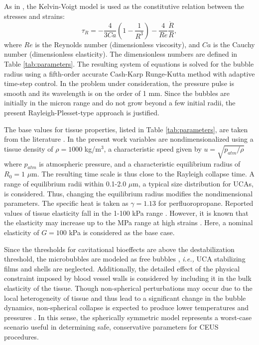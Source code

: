 \documentclass[%
preprint,%
author-year,%
]{jasatex}
\begin{document}
As in \cite{yang2005}, the Kelvin-Voigt model is used as the
constitutive relation between the stresses and strains:
\begin{equation}
  \tau_R = -\frac{4}{3
  Ca}\left(1-\frac{1}{R^3}\right) - \frac{4}{Re}\frac{\dot{R}}{R},
\end{equation}
where $Re$ is the Reynolds number (dimensionless viscosity), and $Ca$ is the Cauchy number (dimensionless elasticity).  The dimensionless numbers are
defined in Table \ref{tab:parameters}.  %
The resulting system of
equations is solved for the bubble radius using a fifth-order accurate
Cash-Karp Runge-Kutta method with adaptive time-step control. In the
problem under consideration, the pressure pulse is smooth and its
wavelength is on the order of 1 mm. Since the bubbles are initially in
the micron range and do not grow beyond a few initial radii, the
present Rayleigh-Plesset-type approach is justified.



The base values for tissue properties, listed in Table
\ref{tab:parameters}, are taken from the literature
\cite[]{apfel1991,yang2005}. In the present work 
variables are nondimensionalized using a tissue density 
of $\rho=1000$ kg/m$^3$, a characteristic speed given by 
$u=\sqrt{p_{atm}/\rho}$ where $p_{atm}$ is atmospheric 
pressure, and a characteristic equilibrium radius of 
$R_0=1$ $\mu$m. The resulting 
time scale is thus close to the Rayleigh collapse time.  A
range of equilibrium radii within 0.1-2.0 $\mu$m, a typical size
distribution for UCAs, is considered. Thus, changing
the equilibrium radius modifies the nondimensional parameters.
The specific heat is taken 
as $\gamma =1.13$ for perfluoropropane. Reported values of 
tissue elasticity fall in the 1-100 kPa range \cite[]{arda2011%
}. However, it is known that the elasticity may increase up 
to the MPa range at high strains \cite[]{krouskop1998}.  
Here, a nominal elasticity of $G=100$ kPa is considered as the base case.

Since the thresholds for cavitational bioeffects are above the destabilization 
threshold, the microbubbles are modeled as free bubbles \cite[]{sboros2002,marmottant2005},
\textit{i.e.,} UCA stabilizing films and shells are neglected.
Additionally, the detailed effect of the physical constraint
imposed by blood vessel walls is considered by including it 
in the bulk elasticity of the tissue. Though non-spherical 
perturbations may occur due to the local heterogeneity of tissue and
thus lead to a significant change in the bubble 
dynamics, non-spherical collapse is expected to produce lower
temperatures and pressures \cite[]{johnsen2009}.  In this sense, the spherically symmetric
model represents a worst-case scenario useful in determining safe, 
conservative parameters for CEUS procedures.
\end{document}
